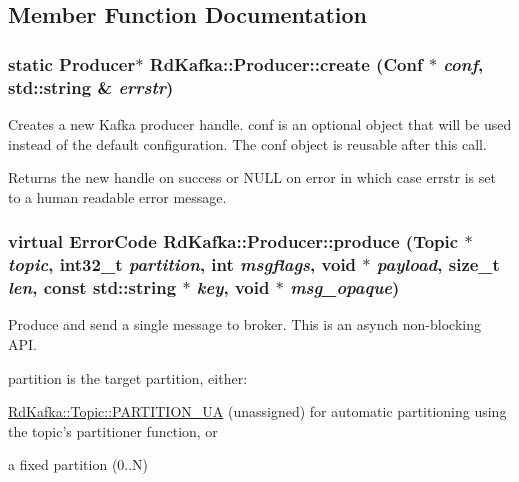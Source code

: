\subsection{Member Function Documentation}
\hypertarget{classRdKafka_1_1Producer_a540569ee0152703cdad4b45419f64b39}{
\subsubsection[{create}]{\setlength{\rightskip}{0pt plus 5cm}static {\bf Producer}$\ast$ RdKafka::Producer::create ({\bf Conf} $\ast$ {\em conf}, \/  std::string \& {\em errstr})}}
\label{classRdKafka_1_1Producer_a540569ee0152703cdad4b45419f64b39}


Creates a new Kafka producer handle. {\ttfamily conf} is an optional object that will be used instead of the default configuration. The {\ttfamily conf} object is reusable after this call.

\begin{DoxyReturn}{Returns}
the new handle on success or NULL on error in which case {\ttfamily errstr} is set to a human readable error message. 
\end{DoxyReturn}
\hypertarget{classRdKafka_1_1Producer_ab90a30c5e5fb006a3b4004dc4c9a7923}{
\subsubsection[{produce}]{\setlength{\rightskip}{0pt plus 5cm}virtual ErrorCode RdKafka::Producer::produce ({\bf Topic} $\ast$ {\em topic}, \/  int32\_\-t {\em partition}, \/  int {\em msgflags}, \/  void $\ast$ {\em payload}, \/  size\_\-t {\em len}, \/  const std::string $\ast$ {\em key}, \/  void $\ast$ {\em msg\_\-opaque})}}
\label{classRdKafka_1_1Producer_ab90a30c5e5fb006a3b4004dc4c9a7923}


Produce and send a single message to broker. This is an asynch non-\/blocking API.

{\ttfamily partition} is the target partition, either:
\begin{DoxyItemize}
\item \hyperlink{classRdKafka_1_1Topic_ab69c18779df1c8e150648e640b159654}{RdKafka::Topic::PARTITION\_\-UA} (unassigned) for automatic partitioning using the topic's partitioner function, or
\item a fixed partition (0..N)
\end{DoxyItemize}

